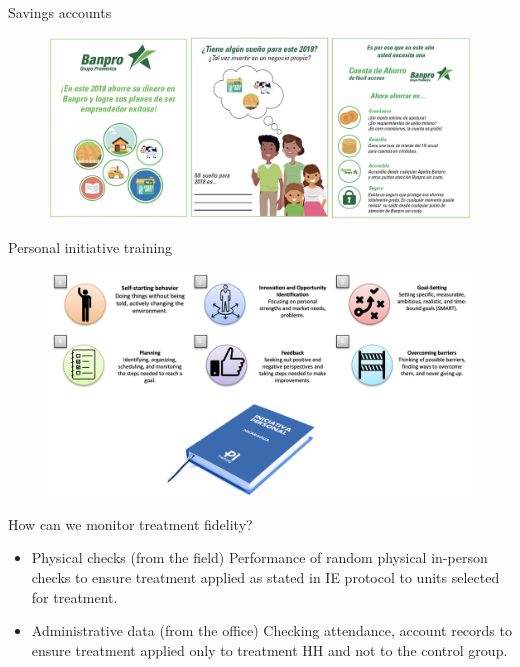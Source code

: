 \documentclass[aspectratio=169]{beamer}
\begin{document}
\begin{frame}{Savings accounts}

	\begin{figure}
		\centering
		\includegraphics[width=\linewidth]{img/Savings}
	\end{figure}

\end{frame}

\begin{frame}{Personal initiative training}

	\begin{figure}
		\centering
		\includegraphics[width=\linewidth]{img/Training}
	\end{figure}

\end{frame}


\begin{frame}{How can we monitor treatment fidelity?}

\begin{itemize}[<default overlay specification>]
	\item<1>   Physical checks (from the field)
		\newline Performance of random physical in-person checks to ensure treatment applied as stated in IE protocol to units selected for treatment.
	\item<1> Administrative data (from the office)
		\newline Checking attendance, account records to ensure treatment applied only to treatment HH and not to the control group.
\end{itemize}

\end{frame}
\end{document}
